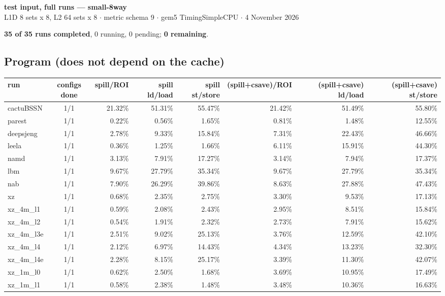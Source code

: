 \documentclass[10pt,a4paper,landscape]{article}
\begin{document}
\begin{center}
{\large\bfseries test input, full runs --- small-8way}\\[3pt]
{\small L1D 8 sets x 8, L2 64 sets x 8 $\cdot$ metric schema 9 $\cdot$ gem5 TimingSimpleCPU $\cdot$ 4 November 2026}
\end{center}
\textbf{35 of 35 runs completed}, 0 running, 0 pending; \textbf{0 remaining}.\par
\subsection*{Program (does not depend on the cache)}
{\footnotesize
\begin{longtable}{lcrrrrrr}
\toprule
run & configs done & spill/ROI & spill ld/load & spill st/store & (spill+csave)/ROI & (spill+csave) ld/load & (spill+csave) st/store \\
\midrule
\endhead
\bottomrule
\endfoot
cactuBSSN & 1/1 & 21.32\% & 51.31\% & 55.47\% & 21.42\% & 51.49\% & 55.80\% \\
parest & 1/1 & 0.22\% & 0.56\% & 1.65\% & 0.81\% & 1.48\% & 12.55\% \\
deepsjeng & 1/1 & 2.78\% & 9.33\% & 15.84\% & 7.31\% & 22.43\% & 46.66\% \\
leela & 1/1 & 0.36\% & 1.25\% & 1.66\% & 6.11\% & 15.91\% & 44.30\% \\
namd & 1/1 & 3.13\% & 7.91\% & 17.27\% & 3.14\% & 7.94\% & 17.37\% \\
lbm & 1/1 & 9.67\% & 27.79\% & 35.34\% & 9.67\% & 27.79\% & 35.34\% \\
nab & 1/1 & 7.90\% & 26.29\% & 39.86\% & 8.63\% & 27.88\% & 47.43\% \\
xz & 1/1 & 0.68\% & 2.35\% & 2.75\% & 3.30\% & 9.53\% & 17.13\% \\
xz\_4m\_l1 & 1/1 & 0.59\% & 2.08\% & 2.43\% & 2.95\% & 8.51\% & 15.84\% \\
xz\_4m\_l2 & 1/1 & 0.54\% & 1.91\% & 2.32\% & 2.73\% & 7.91\% & 15.62\% \\
xz\_4m\_l3e & 1/1 & 2.51\% & 9.02\% & 25.13\% & 3.76\% & 12.59\% & 42.10\% \\
xz\_4m\_l4 & 1/1 & 2.12\% & 6.97\% & 14.43\% & 4.34\% & 13.23\% & 32.30\% \\
xz\_4m\_l4e & 1/1 & 2.28\% & 8.15\% & 25.17\% & 3.39\% & 11.30\% & 42.07\% \\
xz\_1m\_l0 & 1/1 & 0.62\% & 2.50\% & 1.68\% & 3.69\% & 10.95\% & 17.49\% \\
xz\_1m\_l1 & 1/1 & 0.58\% & 2.38\% & 1.48\% & 3.48\% & 10.36\% & 16.63\% \\

\end{longtable}}
\end{document}
